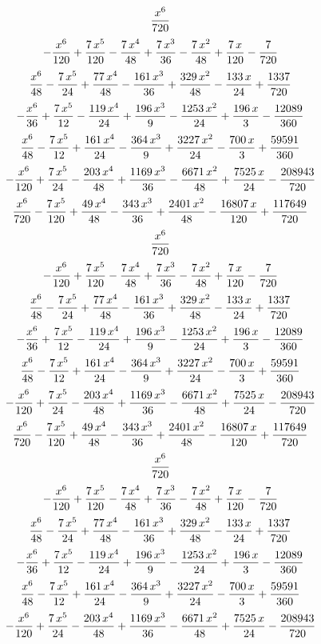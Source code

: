 $${{x^6}\over{720}}$$
$$-{{x^6}\over{120}}+{{7\,x^5}\over{120}}-{{7\,x^4}\over{48}}+{{7\,x^
 3}\over{36}}-{{7\,x^2}\over{48}}+{{7\,x}\over{120}}-{{7}\over{720}}$$
$${{x^6}\over{48}}-{{7\,x^5}\over{24}}+{{77\,x^4}\over{48}}-{{161\,x^
 3}\over{36}}+{{329\,x^2}\over{48}}-{{133\,x}\over{24}}+{{1337}\over{
 720}}$$
$$-{{x^6}\over{36}}+{{7\,x^5}\over{12}}-{{119\,x^4}\over{24}}+{{196\,
 x^3}\over{9}}-{{1253\,x^2}\over{24}}+{{196\,x}\over{3}}-{{12089
 }\over{360}}$$
$${{x^6}\over{48}}-{{7\,x^5}\over{12}}+{{161\,x^4}\over{24}}-{{364\,x
 ^3}\over{9}}+{{3227\,x^2}\over{24}}-{{700\,x}\over{3}}+{{59591
 }\over{360}}$$
$$-{{x^6}\over{120}}+{{7\,x^5}\over{24}}-{{203\,x^4}\over{48}}+{{1169
 \,x^3}\over{36}}-{{6671\,x^2}\over{48}}+{{7525\,x}\over{24}}-{{
 208943}\over{720}}$$
$${{x^6}\over{720}}-{{7\,x^5}\over{120}}+{{49\,x^4}\over{48}}-{{343\,
 x^3}\over{36}}+{{2401\,x^2}\over{48}}-{{16807\,x}\over{120}}+{{
 117649}\over{720}}$$
$${{x^6}\over{720}}$$
$$-{{x^6}\over{120}}+{{7\,x^5}\over{120}}-{{7\,x^4}\over{48}}+{{7\,x^
 3}\over{36}}-{{7\,x^2}\over{48}}+{{7\,x}\over{120}}-{{7}\over{720}}$$
$${{x^6}\over{48}}-{{7\,x^5}\over{24}}+{{77\,x^4}\over{48}}-{{161\,x^
 3}\over{36}}+{{329\,x^2}\over{48}}-{{133\,x}\over{24}}+{{1337}\over{
 720}}$$
$$-{{x^6}\over{36}}+{{7\,x^5}\over{12}}-{{119\,x^4}\over{24}}+{{196\,
 x^3}\over{9}}-{{1253\,x^2}\over{24}}+{{196\,x}\over{3}}-{{12089
 }\over{360}}$$
$${{x^6}\over{48}}-{{7\,x^5}\over{12}}+{{161\,x^4}\over{24}}-{{364\,x
 ^3}\over{9}}+{{3227\,x^2}\over{24}}-{{700\,x}\over{3}}+{{59591
 }\over{360}}$$
$$-{{x^6}\over{120}}+{{7\,x^5}\over{24}}-{{203\,x^4}\over{48}}+{{1169
 \,x^3}\over{36}}-{{6671\,x^2}\over{48}}+{{7525\,x}\over{24}}-{{
 208943}\over{720}}$$
$${{x^6}\over{720}}-{{7\,x^5}\over{120}}+{{49\,x^4}\over{48}}-{{343\,
 x^3}\over{36}}+{{2401\,x^2}\over{48}}-{{16807\,x}\over{120}}+{{
 117649}\over{720}}$$
$${{x^6}\over{720}}$$
$$-{{x^6}\over{120}}+{{7\,x^5}\over{120}}-{{7\,x^4}\over{48}}+{{7\,x^
 3}\over{36}}-{{7\,x^2}\over{48}}+{{7\,x}\over{120}}-{{7}\over{720}}$$
$${{x^6}\over{48}}-{{7\,x^5}\over{24}}+{{77\,x^4}\over{48}}-{{161\,x^
 3}\over{36}}+{{329\,x^2}\over{48}}-{{133\,x}\over{24}}+{{1337}\over{
 720}}$$
$$-{{x^6}\over{36}}+{{7\,x^5}\over{12}}-{{119\,x^4}\over{24}}+{{196\,
 x^3}\over{9}}-{{1253\,x^2}\over{24}}+{{196\,x}\over{3}}-{{12089
 }\over{360}}$$
$${{x^6}\over{48}}-{{7\,x^5}\over{12}}+{{161\,x^4}\over{24}}-{{364\,x
 ^3}\over{9}}+{{3227\,x^2}\over{24}}-{{700\,x}\over{3}}+{{59591
 }\over{360}}$$
$$-{{x^6}\over{120}}+{{7\,x^5}\over{24}}-{{203\,x^4}\over{48}}+{{1169
 \,x^3}\over{36}}-{{6671\,x^2}\over{48}}+{{7525\,x}\over{24}}-{{
 208943}\over{720}}$$
